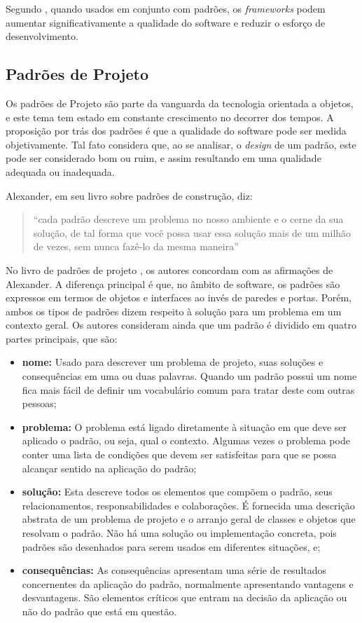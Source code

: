Segundo \cite{Fayad:Schimidt:1997}, quando usados em conjunto com padrões, os \textit{frameworks} podem aumentar significativamente a qualidade do software e reduzir o esforço de desenvolvimento.

\subsection{Padrões de Projeto}

Os padrões de Projeto são parte da vanguarda da tecnologia orientada a objetos, e este tema tem estado em constante crescimento no decorrer dos tempos\cite{Shalloway:Trott:2004}. A proposição por trás dos padrões é que a qualidade do software pode ser medida objetivamente. Tal fato considera que, ao se analisar, o \textit{design} de um padrão, este pode ser considerado bom ou ruim, e assim resultando em uma qualidade adequada ou inadequada\cite{Shalloway:Trott:2004}.

Alexander, em seu livro \cite{Alexander:1979} sobre padrões de construção, diz:

\begin{quote}
	``cada padrão descreve um problema no nosso
ambiente e o cerne da sua solução, de tal forma que você possa usar essa solução mais
de um milhão de vezes, sem nunca fazê-lo da mesma maneira''
\end{quote}

No livro de padrões de projeto \cite{Gamma:1995}, os autores concordam com as afirmações de Alexander. A diferença principal é que, no âmbito de software, os padrões são expressos em termos de objetos e interfaces ao invés de paredes e portas. Porém, ambos os tipos de padrões dizem respeito à solução para um problema em um contexto geral. Os autores consideram ainda que um padrão é dividido em quatro partes principais, que são:

\begin{itemize}
	\item \textbf{nome:} Usado para descrever um problema de projeto, suas soluções e consequências em uma ou duas palavras. Quando um padrão possui um nome fica mais fácil de definir um vocabulário comum para tratar deste com outras pessoas;
	\item \textbf{problema:} O problema está ligado diretamente à situação em que deve ser aplicado o padrão, ou seja, qual o contexto. Algumas vezes o problema pode conter uma lista de condições que devem ser satisfeitas para que se possa alcançar sentido na aplicação do padrão;
	\item \textbf{solução:} Esta descreve todos os elementos que compõem o padrão, seus relacionamentos, responsabilidades e colaborações. É fornecida uma descrição abstrata de um problema de projeto e o arranjo geral de classes e objetos que resolvam o padrão. Não há uma solução ou implementação concreta, pois padrões são desenhados para serem usados em diferentes situações, e;
	\item \textbf{consequências:} As consequências apresentam uma série de resultados concernentes da aplicação do padrão, normalmente apresentando vantagens e desvantagens. São elementos críticos que entram na decisão da aplicação ou não do padrão que está em questão.
\end{itemize}

